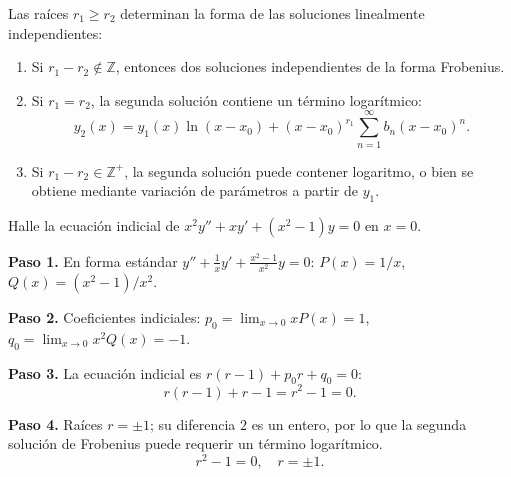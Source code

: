 Las raíces $r_1\ge r_2$ determinan la forma de las soluciones linealmente independientes:
\begin{enumerate}
  \item Si $r_1-r_2\notin \mathbb Z$, entonces dos soluciones independientes de la forma Frobenius.
  \item Si $r_1=r_2$, la segunda solución contiene un término logarítmico:
    \[
      y_2(x) = y_1(x)\ln(x-x_0) + (x-x_0)^{r_1}\sum_{n=1}^{\infty} b_n (x-x_0)^n.
    \]
  \item Si $r_1-r_2\in \mathbb Z^+$, la segunda solución puede contener logaritmo, o bien se obtiene mediante variación de parámetros a partir de $y_1$.
\end{enumerate}

\begin{example}
  Halle la ecuación indicial de $x^2 y''+x y'+(x^2-1)y=0$ en $x=0$.
  \begin{myproof}
    \textbf{Paso 1.} En forma estándar $y''+\frac{1}{x}y'+\frac{x^2-1}{x^2}y=0$: $P(x)=1/x$, $Q(x)=(x^2-1)/x^2$.

    \textbf{Paso 2.} Coeficientes indiciales: $p_0=\lim_{x\to0}xP(x)=1$, $q_0=\lim_{x\to0}x^2 Q(x)=-1$.

    \textbf{Paso 3.} La ecuación indicial es $r(r-1)+p_0 r+q_0=0$:
    \[
      r(r-1)+r-1=r^2-1=0.
    \]

    \textbf{Paso 4.} Raíces $r=\pm1$; su diferencia $2$ es un entero, por lo que la segunda solución de Frobenius puede requerir un término logarítmico.
    \[
      \boxed{r^2-1=0,\quad r=\pm1.}
    \]
  \end{myproof}
\end{example}

